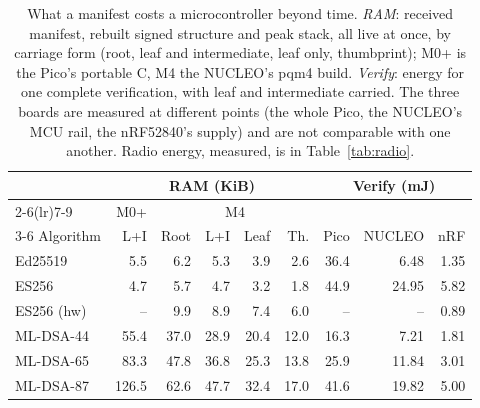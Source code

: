 \begin{table}[t]
\caption{What a manifest costs a microcontroller beyond time. \emph{RAM}: received manifest, rebuilt signed structure and peak stack, all live at once, by carriage form (root, leaf and intermediate, leaf only, thumbprint); M0+ is the Pico's portable C, M4 the NUCLEO's pqm4 build. \emph{Verify}: energy for one complete verification, with leaf and intermediate carried. The three boards are measured at different points (the whole Pico, the NUCLEO's MCU rail, the nRF52840's supply) and are not comparable with one another. Radio energy, measured, is in Table~\ref{tab:radio}.}
\label{tab:mcucost}
\small
\setlength{\tabcolsep}{3.6pt}
\begin{tabular}{lrrrrrrrr}
\toprule
 & \multicolumn{5}{c}{RAM (KiB)} & \multicolumn{3}{c}{Verify (mJ)}\\
\cmidrule(lr){2-6}\cmidrule(lr){7-9}
 & M0+ & \multicolumn{4}{c}{M4} & & & \\
\cmidrule(lr){3-6}
Algorithm & L+I & Root & L+I & Leaf & Th. & Pico & NUCLEO & nRF\\
\midrule
Ed25519 & 5.5 & 6.2 & 5.3 & 3.9 & 2.6 & 36.4 & 6.48 & 1.35\\
ES256 & 4.7 & 5.7 & 4.7 & 3.2 & 1.8 & 44.9 & 24.95 & 5.82\\
ES256 (hw) & -- & 9.9 & 8.9 & 7.4 & 6.0 & -- & -- & 0.89\\
ML-DSA-44 & 55.4 & 37.0 & 28.9 & 20.4 & 12.0 & 16.3 & 7.21 & 1.81\\
ML-DSA-65 & 83.3 & 47.8 & 36.8 & 25.3 & 13.8 & 25.9 & 11.84 & 3.01\\
ML-DSA-87 & 126.5 & 62.6 & 47.7 & 32.4 & 17.0 & 41.6 & 19.82 & 5.00\\
\bottomrule
\end{tabular}
\end{table}
